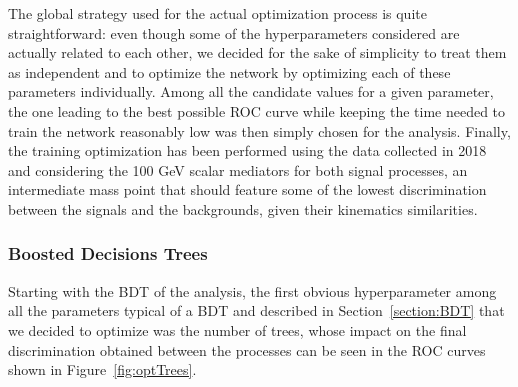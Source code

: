\documentclass[a4paper, 10pt, openright]{report}
\begin{document}
\begin{appendices}
The global strategy used for the actual optimization process is quite straightforward: even though some of the hyperparameters considered are actually related to each other, we decided for the sake of simplicity to treat them as independent and to optimize the network by optimizing each of these parameters individually. Among all the candidate values for a given parameter, the one leading to the best possible ROC curve while keeping the time needed to train the network reasonably low was then simply chosen for the analysis. Finally, the training optimization has been performed using the data collected in 2018 and considering the 100 GeV scalar mediators for both signal processes, an intermediate mass point that should feature some of the lowest discrimination between the signals and the backgrounds, given their kinematics similarities. %

\subsubsection{Boosted Decisions Trees}

Starting with the \ac{BDT} of the analysis, the first obvious hyperparameter among all the parameters typical of a \ac{BDT} and described in Section~\ref{section:BDT} that we decided to optimize was the number of trees, whose impact on the final discrimination obtained between the processes can be seen in the \ac{ROC} curves shown in Figure~\ref{fig:optTrees}.



\end{appendices}
\end{document}
